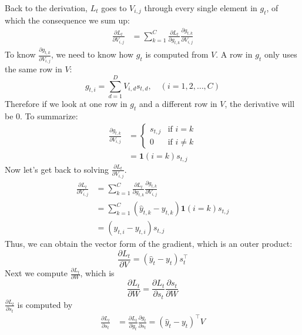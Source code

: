 \documentclass{article}
\begin{document}
Back to the derivation, $L_t$ goes to $V_{i, j}$ through every single element in $g_t$, of which the consequence we sum up:
\begin{align}
    \frac{\partial L_t}{\partial V_{i, j}} &= \sum_{k=1}^C \frac{\partial L_t}{\partial g_{t, k}} \frac{\partial g_{t, k}}{\partial V_{i, j}}
\end{align}
To know $\frac{\partial g_{t, k}}{\partial V_{i, j}}$, we need to know how $g_t$ is computed from $V$. A row in $g_t$ only uses the same row in $V$:
\begin{equation}
    g_{t, i} = \sum_{d = 1}^DV_{i, d}s_{t, d}, \quad (i=1, 2, \dots, C)
\end{equation}
Therefore if we look at one row in $g_t$ and a different row in $V$, the derivative will be 0. To summarize:
\begin{align}
    \frac{\partial g_{t, k}}{\partial V_{i, j}} &= 
    \begin{cases}
    s_{t, j} & \text{if } i = k \\
    0 & \text{if } i\neq k
    \end{cases} \\
    &= \mathbf{1}(i=k)s_{t, j}
\end{align}
Now let's get back to solving $\frac{\partial L_t}{\partial V_{i, j}}$. 
\begin{align}
    \frac{\partial L_t}{\partial V_{i, j}} &= \sum_{k=1}^C \frac{\partial L_t}{\partial g_{t, k}} \frac{\partial g_{t, k}}{\partial V_{i, j}} \\
    &= \sum_{k=1}^C (\hat{y}_{t, k} - y_{t, k})\mathbf{1}(i=k)s_{t, j} \\
    &= (\hat{y}_{t, i} - y_{t, i})s_{t, j}
\end{align}
Thus, we can obtain the vector form of the gradient, which is an outer product:
\begin{equation}
    \frac{\partial L_t}{\partial V} = (\hat{y}_t - y_t)s_t^\top
\end{equation}
Next we compute $\frac{\partial L_t}{\partial W}$, which is 
\begin{equation}
    \frac{\partial L_t}{\partial W} = \frac{\partial L_t}{\partial s_t}\frac{\partial s_t}{\partial W}
\end{equation}
$\frac{\partial L_t}{\partial s_t}$ is computed by
\begin{align}
    \frac{\partial L_t}{\partial s_t} &= \frac{\partial L_t}{\partial g_t}\frac{\partial g_t}{\partial s_t}
    = (\hat{y}_t - y_t)^\top V
\end{align}
\end{document}
